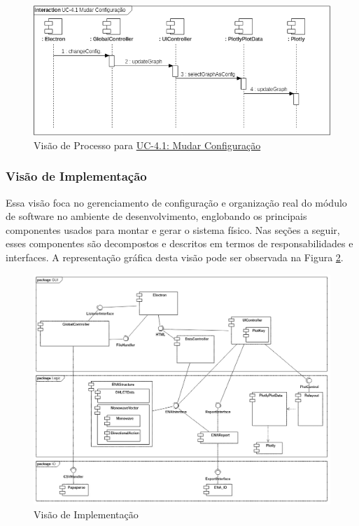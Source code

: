 \documentclass[12pt]{article}
\begin{document}
\begin{figure}[H]
	\centering
	\includegraphics[width=\textwidth]{ProcessViewUC-4_1.png}
	\caption{Visão de Processo para \hyperref[tab:UC-4.1]{UC-4.1: Mudar Configuração}}
	\label{fig:ProcessView-UC-4.1}
\end{figure}

\subsubsection{Visão de Implementação}

Essa visão foca no gerenciamento de configuração e organização real do módulo de software
no ambiente de desenvolvimento, englobando os principais componentes usados para montar e
gerar o sistema físico. Nas seções a seguir, esses componentes são decompostos e descritos
em termos de responsabilidades e interfaces.
A representação gráfica desta visão pode ser observada na Figura \ref{fig:DevelopmentView}.

\begin{figure}[H]
	\centering
	\includegraphics[width=\textwidth]{DevelopmentView.png}
	\caption{Visão de Implementação}\label{fig:DevelopmentView}
\end{figure}
\end{document}
